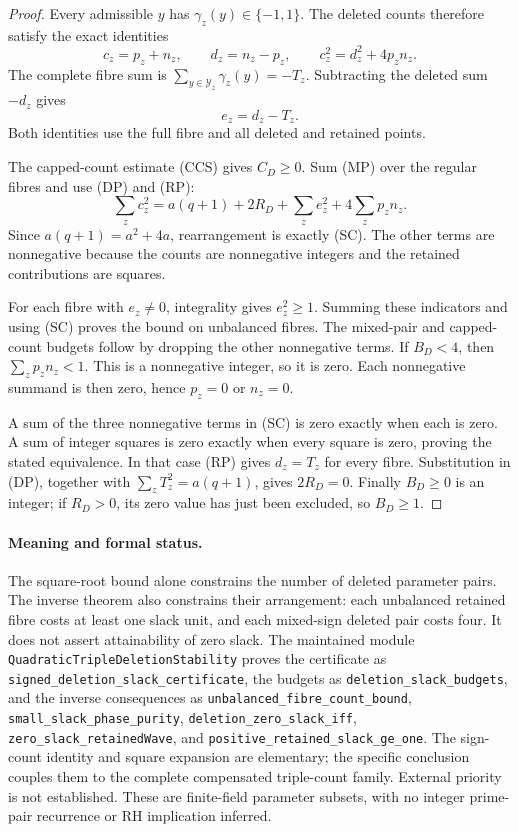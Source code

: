 \documentclass[11pt]{article}
\begin{document}
\begin{proof}
Every admissible \(y\) has \(\gamma_z(y)\in\{-1,1\}\). The deleted
counts therefore satisfy the exact identities
\[
 c_z=p_z+n_z,\qquad d_z=n_z-p_z,\qquad
 c_z^2=d_z^2+4p_zn_z. \tag{MP}
\]
The complete fibre sum is \(\sum_{y\in\mathcal Y_z}\gamma_z(y)=-T_z\).
Subtracting the deleted sum \(-d_z\) gives
\[
 e_z=d_z-T_z. \tag{RP}
\]
Both identities use the full fibre and all deleted and retained points.

The capped-count estimate (CCS) gives \(C_D\ge0\).
Sum (MP) over the regular fibres and use (DP) and (RP):
\[
 \sum_z c_z^2
   =a(q+1)+2R_D+\sum_z e_z^2+4\sum_zp_zn_z.
\]
Since \(a(q+1)=a^2+4a\), rearrangement is exactly (SC).
The other terms are nonnegative because the counts are nonnegative
integers and the retained contributions are squares.

For each fibre with \(e_z\ne0\), integrality gives \(e_z^2\ge1\).
Summing these indicators and using (SC) proves the bound on
unbalanced fibres. The mixed-pair and capped-count budgets follow
by dropping the other nonnegative terms.
If \(B_D<4\), then \(\sum_zp_zn_z<1\).
This is a nonnegative integer, so it is zero. Each nonnegative
summand is then zero, hence \(p_z=0\) or \(n_z=0\).

A sum of the three nonnegative terms in (SC) is zero exactly when
each is zero. A sum of integer squares is zero exactly when every
square is zero, proving the stated equivalence.
In that case (RP) gives \(d_z=T_z\) for every fibre.
Substitution in (DP), together with
\(\sum_zT_z^2=a(q+1)\), gives \(2R_D=0\).
Finally \(B_D\ge0\) is an integer; if \(R_D>0\), its zero value has
just been excluded, so \(B_D\ge1\).
\end{proof}

\paragraph{Meaning and formal status.}
The square-root bound alone constrains the number of deleted
parameter pairs. The inverse theorem also constrains their arrangement:
each unbalanced retained fibre costs at least one slack unit,
and each mixed-sign deleted pair costs four.
It does not assert attainability of zero slack.
The maintained module
\texttt{QuadraticTripleDeletionStability} proves the certificate as
\texttt{signed\_deletion\_slack\_certificate}, the budgets as
\texttt{deletion\_slack\_budgets}, and the inverse consequences as
\texttt{unbalanced\_fibre\_count\_bound},
\texttt{small\_slack\_phase\_purity},
\texttt{deletion\_zero\_slack\_iff},
\texttt{zero\_slack\_retainedWave}, and
\texttt{positive\_retained\_slack\_ge\_one}.
The sign-count identity and square expansion are elementary;
the specific conclusion couples them to the complete compensated
triple-count family. External priority is not established.
These are finite-field parameter subsets, with no integer
prime-pair recurrence or RH implication inferred.
\end{document}
